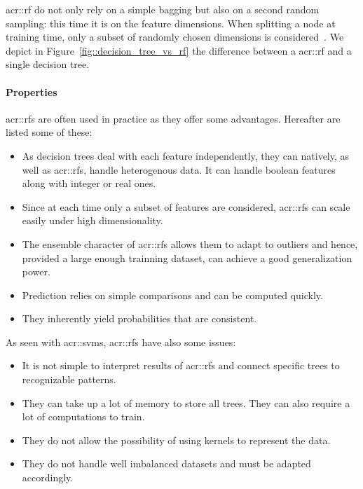                 \gls{acr::rf} do not only rely on a simple bagging but also on a second random sampling: this time it is on the feature dimensions.
                When splitting a node at training time, only a subset of randomly chosen dimensions is considered~\parencite{breiman2001random}.
                We depict in Figure~\ref{fig::decision_tree_vs_rf} the difference between a \gls{acr::rf} and a single decision tree.

            \paragraph{Properties}
                \glspl{acr::rf} are often used in practice as they offer some advantages.
                Hereafter are listed some of these:
                \begin{itemize}
                    \item As decision trees deal with each feature independently, they can natively, as well as \glspl{acr::rf}, handle heterogenous data.
                        It can handle boolean features along with integer or real ones.
                    \item Since at each time only a subset of features are considered, \glspl{acr::rf} can scale easily under high dimensionality.
                    \item The ensemble character of \glspl{acr::rf} allows them to adapt to outliers and hence, provided a large enough trainning dataset, can achieve a good generalization power.
                    \item Prediction relies on simple comparisons and can be computed quickly.
                    \item They inherently yield probabilities that are consistent.
                \end{itemize}
                As seen with \glspl{acr::svm}, \glspl{acr::rf} have also some issues:
                \begin{itemize}
                    \item It is not simple to interpret results of \glspl{acr::rf} and connect specific trees to recognizable patterns.
                    \item They can take up a lot of memory to store all trees.
                            They can also require a lot of computations to train.
                    \item They do not allow the possibility of using kernels to represent the data.
                    \item They do not handle well imbalanced datasets and must be adapted accordingly.
                \end{itemize}
                

